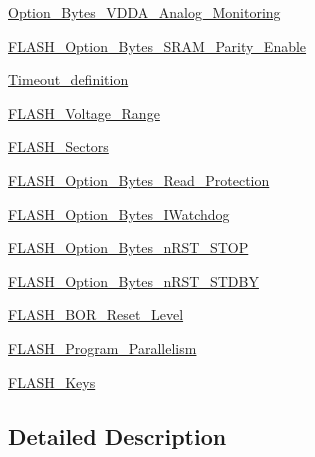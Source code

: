\begin{DoxyCompactItemize}
\item 
\hyperlink{group___option___bytes___v_d_d_a___analog___monitoring}{Option\-\_\-\-Bytes\-\_\-\-V\-D\-D\-A\-\_\-\-Analog\-\_\-\-Monitoring}
\item 
\hyperlink{group___f_l_a_s_h___option___bytes___s_r_a_m___parity___enable}{F\-L\-A\-S\-H\-\_\-\-Option\-\_\-\-Bytes\-\_\-\-S\-R\-A\-M\-\_\-\-Parity\-\_\-\-Enable}
\item 
\hyperlink{group___timeout__definition}{Timeout\-\_\-definition}
\item 
\hyperlink{group___f_l_a_s_h___voltage___range}{F\-L\-A\-S\-H\-\_\-\-Voltage\-\_\-\-Range}
\item 
\hyperlink{group___f_l_a_s_h___sectors}{F\-L\-A\-S\-H\-\_\-\-Sectors}
\item 
\hyperlink{group___f_l_a_s_h___option___bytes___read___protection}{F\-L\-A\-S\-H\-\_\-\-Option\-\_\-\-Bytes\-\_\-\-Read\-\_\-\-Protection}
\item 
\hyperlink{group___f_l_a_s_h___option___bytes___i_watchdog}{F\-L\-A\-S\-H\-\_\-\-Option\-\_\-\-Bytes\-\_\-\-I\-Watchdog}
\item 
\hyperlink{group___f_l_a_s_h___option___bytes__n_r_s_t___s_t_o_p}{F\-L\-A\-S\-H\-\_\-\-Option\-\_\-\-Bytes\-\_\-n\-R\-S\-T\-\_\-\-S\-T\-O\-P}
\item 
\hyperlink{group___f_l_a_s_h___option___bytes__n_r_s_t___s_t_d_b_y}{F\-L\-A\-S\-H\-\_\-\-Option\-\_\-\-Bytes\-\_\-n\-R\-S\-T\-\_\-\-S\-T\-D\-B\-Y}
\item 
\hyperlink{group___f_l_a_s_h___b_o_r___reset___level}{F\-L\-A\-S\-H\-\_\-\-B\-O\-R\-\_\-\-Reset\-\_\-\-Level}
\item 
\hyperlink{group___f_l_a_s_h___program___parallelism}{F\-L\-A\-S\-H\-\_\-\-Program\-\_\-\-Parallelism}
\item 
\hyperlink{group___f_l_a_s_h___keys}{F\-L\-A\-S\-H\-\_\-\-Keys}
\end{DoxyCompactItemize}


\subsection{Detailed Description}
